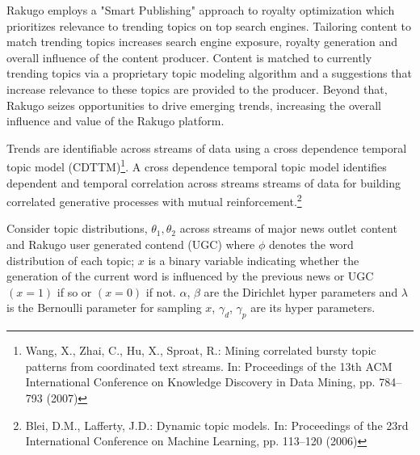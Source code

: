 \documentclass{article}
\begin{document}
Rakugo employs a "Smart Publishing" approach to royalty optimization which prioritizes relevance to trending topics on top search engines. Tailoring content to match trending topics increases search engine exposure, royalty generation and overall influence of the content producer. Content is matched to currently trending topics via a proprietary topic modeling algorithm and a suggestions that increase relevance to these topics are provided to the producer. Beyond that, Rakugo seizes opportunities to drive emerging trends, increasing the overall influence and value of the Rakugo platform. 

Trends are identifiable across streams of data using a cross dependence temporal topic model (CDTTM)\footnote{Wang, X., Zhai, C., Hu, X., Sproat, R.: Mining correlated bursty topic patterns from coordinated text streams. In: Proceedings of the 13th ACM International Conference on Knowledge Discovery in Data Mining, pp. 784–793 (2007)}. A cross dependence temporal topic model identifies dependent and temporal correlation across streams streams of data for building correlated generative processes with mutual reinforcement.\footnote{Blei, D.M., Lafferty, J.D.: Dynamic topic models. In: Proceedings of the 23rd International Conference on Machine Learning, pp. 113–120 (2006)}

Consider topic distributions, \begin{math} \theta_1, \theta_2 \end{math} across streams of major news outlet content and Rakugo user generated contend (UGC) where \begin{math} \phi \end{math} denotes the word distribution of each topic; \begin{math} x \end{math} is a binary variable indicating whether the generation of the current word is influenced by
the previous news or UGC \begin{math} (x = 1) \end{math} if so or \begin{math} (x = 0) \end{math} if not. \begin{math} \alpha \end{math}, \begin{math} \beta \end{math} are the Dirichlet hyper
parameters and \begin{math} \lambda \end{math} is the Bernoulli parameter for sampling \begin{math} x \end{math}, \begin{math} \gamma_d \end{math}, \begin{math} \gamma_p \end{math} are its hyper
parameters.
\end{document}
